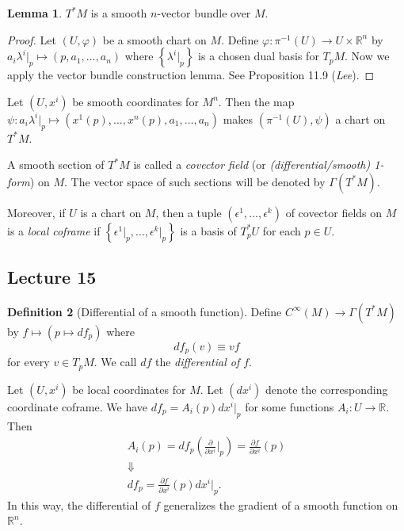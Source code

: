 \documentclass[10pt,letterpaper,cm]{nupset}
\theoremstyle{definition}
\newtheorem{definition}{Definition}[subsection]
\theoremstyle{theorem}
\newtheorem{lemma}[definition]{Lemma}
\theoremstyle{remark}
\newcommand{\R}{\mathbb R}
\newcommand{\1}{\mathbf{1}}
\newcommand{\0}{\vec 0}
\begin{document}
\begin{lemma}
$T^{\ast}M$ is a smooth $n$-vector bundle over $M$.
\end{lemma}
\begin{proof}
Let $\left(U, \varphi\right)$ be a smooth chart on $M$. Define $\varphi : \pi^{-1}(U) \to U \times \R^n$ by $a_i \lambda^i\bigr\rvert_p \mapsto \left(p, a_1, \ldots, a_n\right)$ where $\left\{\lambda^i \bigr\rvert_p\right\}$ is a chosen dual basis for $T_pM$. Now we apply the vector bundle construction lemma. See Proposition 11.9 (\textit{Lee}).
\end{proof}


Let $(U, x^i)$ be smooth coordinates for $M^n$. Then the map $\psi: a_i\lambda^i\bigr\rvert_p \mapsto \left(x^1(p), \ldots, x^n(p), a_1, \ldots, a_n\right)$ makes  $\left(\pi^{-1}(U), \psi\right)$ a chart on $T^{\ast}M$.

\medskip

A smooth section of $T^{\ast}M$ is called a \textit{covector field} (or \textit{(differential/smooth) 1-form}) on $M$. The vector space of such sections will be denoted by $\Gamma(T^{\ast}M)$.

Moreover, if $U$ is a chart on $M$, then a tuple $\left(\epsilon^1, \ldots, \epsilon^k\right)$ of covector fields on $M$ is a \textit{local coframe} if $\left\{\epsilon^1\bigr\rvert_p, \ldots, \epsilon^k\bigr\rvert_p\right\}$ is a basis of $T_p^{\ast}{U}$ for each $p\in U$.



\subsection{Lecture 15}

\begin{definition}[Differential of a smooth function]\label{diff}
Define $C^{\infty}(M) \to \Gamma(T^{\ast}M)$ by $f \mapsto \left(p\mapsto df_p\right)$ where $$df_p(v) \equiv vf$$ for every $v\in T_pM$. We call $df$ the \textit{differential of $f$}.
\end{definition}


Let $\left(U, x^i\right)$ be local coordinates for $M$. Let $\left(dx^i\right)$ denote the corresponding coordinate coframe. We have $df_p = A_i(p)dx^i\bigr\rvert_p$ for some functions $A_i : U \to \R$. Then 
\begin{gather*}
A_i(p) = df_p\left(\frac{\partial}{\partial{x^i}}\bigr\rvert_p\right) = \frac{\partial{f}}{\partial{x^i}}(p)
\\ \Downarrow
\\ df_p = \frac{\partial{f}}{\partial{x^i}}(p) dx^i\bigr\rvert_p.
\end{gather*} In this way, the differential of $f$ generalizes the gradient of a smooth function on $\R^n$.
\end{document}
